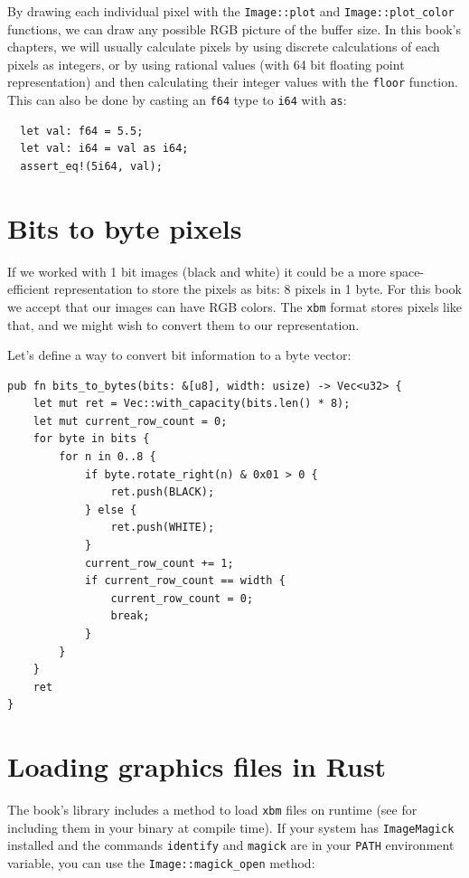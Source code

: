 \documentclass[12pt,openany,a4,usenames,dvipsnames]{book}
\newcommand\pixels{{\pixelfont{}pixels}}
\newcommand\Rust{{\fira{}\textbf{Rust}}}
\begin{document}
By drawing each individual pixel with the \texttt{Image::plot} and \texttt{Image::plot\_color} functions, we can draw any possible RGB picture of the buffer size. In this book's chapters, we will usually calculate pixels by using discrete calculations of each pixels as integers, or by using rational values (with 64 bit floating point representation) and then calculating their integer values with the \texttt{floor} function. This can also be done by casting an \texttt{f64} type to \texttt{i64} with \texttt{as}: 

\begin{verbatim}
  let val: f64 = 5.5;
  let val: i64 = val as i64;
  assert_eq!(5i64, val);
\end{verbatim}

\chapter{Bits to byte \pixels{}}\label{ch:bitstobytes}
If we worked with 1 bit images (black and white) it could be a more space-efficient representation to store the pixels as bits: 8 pixels in 1 byte. For this book we accept that our images can have RGB colors. The \texttt{xbm} format stores pixels like that, and we might wish to convert them to our representation.

Let's define a way to convert bit information to a byte vector:

\begin{verbatim}
pub fn bits_to_bytes(bits: &[u8], width: usize) -> Vec<u32> {
    let mut ret = Vec::with_capacity(bits.len() * 8);
    let mut current_row_count = 0;
    for byte in bits {
        for n in 0..8 {
            if byte.rotate_right(n) & 0x01 > 0 {
                ret.push(BLACK);
            } else {
                ret.push(WHITE);
            }
            current_row_count += 1;
            if current_row_count == width {
                current_row_count = 0;
                break;
            }
        }
    }
    ret
}
\end{verbatim}

\chapter{Loading graphics files in \Rust{}}
The book's library includes a method to load \texttt{xbm} files on runtime (see \emph{} for including them in your binary at compile time). If your system has \texttt{ImageMagick} installed and the commands \texttt{identify} and \texttt{magick} are in your \texttt{PATH} environment variable, you can use the \texttt{Image::magick\_open} method:
\end{document}
